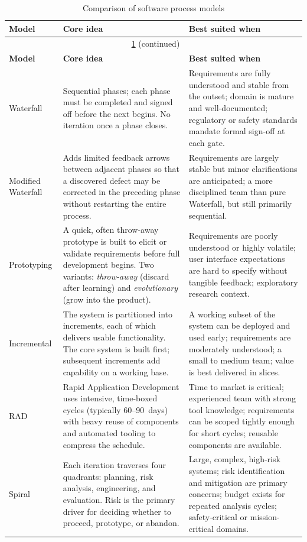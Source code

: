\begin{longtable}{@{}p{3.2cm} p{5.5cm} p{5.5cm}@{}}
\caption{Comparison of software process models}
\label{tab:process-models} \\
\toprule
\textbf{Model} & \textbf{Core idea} & \textbf{Best suited when} \\
\midrule
\endfirsthead
\multicolumn{3}{c}{\tablename~\ref{tab:process-models} (continued)} \\
\toprule
\textbf{Model} & \textbf{Core idea} & \textbf{Best suited when} \\
\midrule
\endhead
\bottomrule
\endfoot
\bottomrule
\endlastfoot
Waterfall &
  Sequential phases; each phase must be completed and signed off before the next begins.
  No iteration once a phase closes. &
  Requirements are fully understood and stable from the outset; domain is mature and
  well-documented; regulatory or safety standards mandate formal sign-off at each gate. \\
\addlinespace
Modified Waterfall &
  Adds limited feedback arrows between adjacent phases so that a discovered defect may be
  corrected in the preceding phase without restarting the entire process. &
  Requirements are largely stable but minor clarifications are anticipated; a more
  disciplined team than pure Waterfall, but still primarily sequential. \\
\addlinespace
Prototyping &
  A quick, often throw-away prototype is built to elicit or validate requirements before
  full development begins. Two variants: \textit{throw-away} (discard after learning) and
  \textit{evolutionary} (grow into the product). &
  Requirements are poorly understood or highly volatile; user interface expectations are
  hard to specify without tangible feedback; exploratory research context. \\
\addlinespace
Incremental &
  The system is partitioned into increments, each of which delivers usable functionality.
  The core system is built first; subsequent increments add capability on a working base. &
  A working subset of the system can be deployed and used early; requirements are
  moderately understood; a small to medium team; value is best delivered in slices. \\
\addlinespace
RAD &
  Rapid Application Development uses intensive, time-boxed cycles (typically 60--90~days)
  with heavy reuse of components and automated tooling to compress the schedule. &
  Time to market is critical; experienced team with strong tool knowledge; requirements can
  be scoped tightly enough for short cycles; reusable components are available. \\
\addlinespace
Spiral &
  Each iteration traverses four quadrants: planning, risk analysis, engineering, and
  evaluation. Risk is the primary driver for deciding whether to proceed, prototype, or
  abandon. &
  Large, complex, high-risk systems; risk identification and mitigation are primary
  concerns; budget exists for repeated analysis cycles; safety-critical or
  mission-critical domains. \\
\end{longtable}

